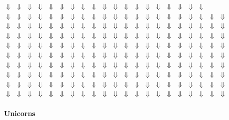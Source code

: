 \documentclass[12pt,twocolumn]{article}
\begin{document}
\begin{center}
$\Downarrow$
$\Downarrow$
$\Downarrow$
$\Downarrow$
$\Downarrow$
$\Downarrow$
$\Downarrow$
$\Downarrow$
$\Downarrow$
$\Downarrow$
$\Downarrow$
$\Downarrow$
$\Downarrow$
$\Downarrow$
$\Downarrow$
$\Downarrow$
$\Downarrow$
$\Downarrow$
$\Downarrow$\\
$\Downarrow$
$\Downarrow$
$\Downarrow$
$\Downarrow$
$\Downarrow$
$\Downarrow$
$\Downarrow$
$\Downarrow$
$\Downarrow$
$\Downarrow$
$\Downarrow$
$\Downarrow$
$\Downarrow$
$\Downarrow$
$\Downarrow$
$\Downarrow$
$\Downarrow$
$\Downarrow$
$\Downarrow$
$\Downarrow$
$\Downarrow$\\
$\Downarrow$
$\Downarrow$
$\Downarrow$
$\Downarrow$
$\Downarrow$
$\Downarrow$
$\Downarrow$
$\Downarrow$
$\Downarrow$
$\Downarrow$
$\Downarrow$
$\Downarrow$
$\Downarrow$
$\Downarrow$
$\Downarrow$
$\Downarrow$
$\Downarrow$
$\Downarrow$
$\Downarrow$
$\Downarrow$
$\Downarrow$\\
$\Downarrow$
$\Downarrow$
$\Downarrow$
$\Downarrow$
$\Downarrow$
$\Downarrow$
$\Downarrow$
$\Downarrow$
$\Downarrow$
$\Downarrow$
$\Downarrow$
$\Downarrow$
$\Downarrow$
$\Downarrow$
$\Downarrow$
$\Downarrow$
$\Downarrow$
$\Downarrow$
$\Downarrow$
$\Downarrow$
$\Downarrow$\\
$\Downarrow$
$\Downarrow$
$\Downarrow$
$\Downarrow$
$\Downarrow$
$\Downarrow$
$\Downarrow$
$\Downarrow$
$\Downarrow$
$\Downarrow$
$\Downarrow$
$\Downarrow$
$\Downarrow$
$\Downarrow$
$\Downarrow$
$\Downarrow$
$\Downarrow$
$\Downarrow$
$\Downarrow$
$\Downarrow$
$\Downarrow$\\
$\Downarrow$
$\Downarrow$
$\Downarrow$
$\Downarrow$
$\Downarrow$
$\Downarrow$
$\Downarrow$
$\Downarrow$
$\Downarrow$
$\Downarrow$
$\Downarrow$
$\Downarrow$
$\Downarrow$
$\Downarrow$
$\Downarrow$
$\Downarrow$
$\Downarrow$
$\Downarrow$
$\Downarrow$
$\Downarrow$
$\Downarrow$\\
$\Downarrow$
$\Downarrow$
$\Downarrow$
$\Downarrow$
$\Downarrow$
$\Downarrow$
$\Downarrow$
$\Downarrow$
$\Downarrow$
$\Downarrow$
$\Downarrow$
$\Downarrow$
$\Downarrow$
$\Downarrow$
$\Downarrow$
$\Downarrow$
$\Downarrow$
$\Downarrow$
$\Downarrow$
$\Downarrow$
$\Downarrow$\\
$\Downarrow$
$\Downarrow$
$\Downarrow$
$\Downarrow$
$\Downarrow$
$\Downarrow$
$\Downarrow$
$\Downarrow$
$\Downarrow$
$\Downarrow$
$\Downarrow$
$\Downarrow$
$\Downarrow$
$\Downarrow$
$\Downarrow$
$\Downarrow$
$\Downarrow$
$\Downarrow$
$\Downarrow$
$\Downarrow$
$\Downarrow$\\
$\Downarrow$
$\Downarrow$
$\Downarrow$
$\Downarrow$
$\Downarrow$
$\Downarrow$
$\Downarrow$
$\Downarrow$
$\Downarrow$
$\Downarrow$
$\Downarrow$
$\Downarrow$
$\Downarrow$
$\Downarrow$
$\Downarrow$
$\Downarrow$
$\Downarrow$
$\Downarrow$
$\Downarrow$
$\Downarrow$
$\Downarrow$\\
$\Downarrow$
$\Downarrow$
$\Downarrow$
$\Downarrow$
$\Downarrow$
$\Downarrow$
$\Downarrow$
$\Downarrow$
$\Downarrow$
$\Downarrow$
$\Downarrow$
$\Downarrow$
$\Downarrow$
$\Downarrow$
$\Downarrow$
$\Downarrow$
$\Downarrow$
$\Downarrow$
$\Downarrow$
$\Downarrow$
$\Downarrow$\\
\textbf{\\Unicorns}
\end{center}
\end{document}
